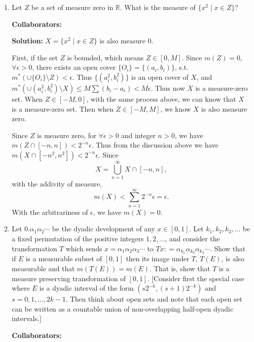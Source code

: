 \documentclass{article}%
\begin{document}
\begin{enumerate}
\bigskip





\item Let $Z$ be a set of measure zero in $\mathbb{R}$.  What is the measure of $\{x^2 \mid x\in Z\}$?



\bigskip
\textbf{Collaborators:}\\
\smallskip
 
\textbf{Solution:}
$X = \{x^2\mid x\in Z\}$ is also measure 0. 

First, if the set $Z$ is bounded, which means $Z\in [0, M]$. Since $m(Z) = 0$, $\forall \epsilon > 0$, there exists an open cover $\{O_i\} = \{(a_i, b_i)\}$, s.t. $m^*(\cup\{O_i\}\setminus Z) < \epsilon$. Thus $\{(a_i^2, b_i^2)\}$ is an open cover of $X$, and $m^*(\cup(a_i^2, b_i^2)\setminus X) \le M\sum(b_i-a_i) < M\epsilon$. Thus now $X$ is a measure-zero set. When $Z \in [-M, 0]$, with the same process above, we can know that $X$ is a measure-zero set. Then when $Z \in [-M, M]$, we know $X$ is also measure zero.

Since $Z$ is measure zero, for $\forall \epsilon > 0$ and integer $n > 0$, we have $m(Z\cap [-n, n]) < 2^{-n}\epsilon$. Thus from the discussion above we have $m(X\cap [-n^2, n^2]) < 2^{-n}\epsilon$. Since 
$$
X = \bigcup_{n=1}^{\infty}X\cap[-n, n],
$$
with the addivity of measure, 
$$
m(X) < \sum_{n=1}^{\infty}2^{-n}\epsilon = \epsilon.
$$
With the arbitrariness of $\epsilon$, we have $m(X) = 0$.
\bigskip


\item  Let $0.\alpha_1 \alpha_2 \cdots$ be the dyadic development of any $x\in[0,1]$. Let $k_1,k_2,k_3,\ldots$ be a fixed permutation of the positive integers $1,2,\ldots$, and consider the transformation $T$ which sends $x = \alpha_1\alpha_2\alpha_3\cdots$ to $Tx: = \alpha_{k_1}\alpha_{k_2}\alpha_{k_3}\cdots$. Show that if $E$ is a measurable subset of $[0,1]$ then its image under $T$, $T(E)$, is also measurable and that $m(T(E))= m(E)$.  That is, show that $T$ is a measure preserving transformation of $[0,1]$. [Consider first the special case where $E$ is a dyadic interval of the form $(s2^{-k}, (s+1)2^{-k})$ and $s = 0,1,\ldots, 2k-1$.  Then think about open sets and note that each open set can be written as a countable union of non-overlapping half-open dyadic intervals.]

\bigskip
\textbf{Collaborators:}\\
\smallskip
 

\end{enumerate}
\end{document}
